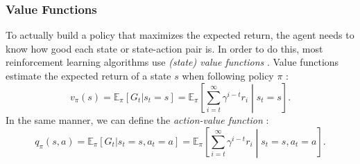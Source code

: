 \subsubsection{Value Functions}
To actually build a policy that maximizes the expected return, the agent needs to know how good each state or state-action pair is. In order to do this, most reinforcement learning algorithms use \textit{(state) value functions} \cite[ch. 3.5]{sutton_reinforcement_nodate}. Value functions estimate the expected return of a state $s$ when following policy $\pi$ \cite[58]{sutton_reinforcement_nodate}:
\begin{equation}
    v_\pi(s) = \mathbb{E}_\pi[G_t | s_t = s] = \mathbb{E}_\pi \left[ \sum_{i=t}^{\infty} \gamma^{i-t} r_{i} \middle| s_t = s \right] \text{.}
    \label{eq:value-function}
\end{equation}
In the same manner, we can define the \textit{action-value function} \cite[58]{sutton_reinforcement_nodate}:
\begin{equation}
    q_\pi(s, a) = \mathbb{E}_\pi[G_t | s_t = s, a_t = a] = \mathbb{E}_\pi \left[ \sum_{i=t}^{\infty} \gamma^{i-t} r_{i} \middle| s_t = s, a_t = a \right] \text{.}
    \label{eq:action-value-function}
\end{equation}



